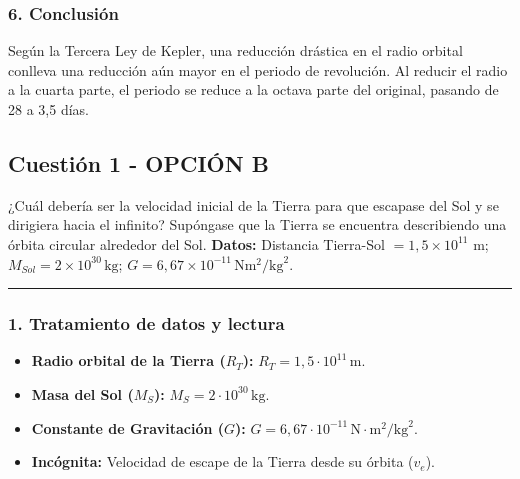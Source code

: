 \subsubsection*{6. Conclusión}
\begin{cajaconclusion}
Según la Tercera Ley de Kepler, una reducción drástica en el radio orbital conlleva una reducción aún mayor en el periodo de revolución. Al reducir el radio a la cuarta parte, el periodo se reduce a la octava parte del original, pasando de 28 a 3,5 días.
\end{cajaconclusion}

\newpage

\subsection{Cuestión 1 - OPCIÓN B}
\label{subsec:1B_2001_jun_ord}

\begin{cajaenunciado}
¿Cuál debería ser la velocidad inicial de la Tierra para que escapase del Sol y se dirigiera hacia el infinito? Supóngase que la Tierra se encuentra describiendo una órbita circular alrededor del Sol.
\textbf{Datos:} Distancia Tierra-Sol $=1,5\times10^{11}$ m; $M_{Sol}=2\times10^{30}\,\text{kg}$; $G=6,67\times10^{-11}\,\text{N}\text{m}^2/\text{kg}^2$.
\end{cajaenunciado}
\hrule

\subsubsection*{1. Tratamiento de datos y lectura}
\begin{itemize}
    \item \textbf{Radio orbital de la Tierra ($R_T$):} $R_T = 1,5 \cdot 10^{11} \, \text{m}$.
    \item \textbf{Masa del Sol ($M_S$):} $M_S = 2 \cdot 10^{30} \, \text{kg}$.
    \item \textbf{Constante de Gravitación ($G$):} $G = 6,67 \cdot 10^{-11} \, \text{N}\cdot\text{m}^2/\text{kg}^2$.
    \item \textbf{Incógnita:} Velocidad de escape de la Tierra desde su órbita ($v_e$).
\end{itemize}

